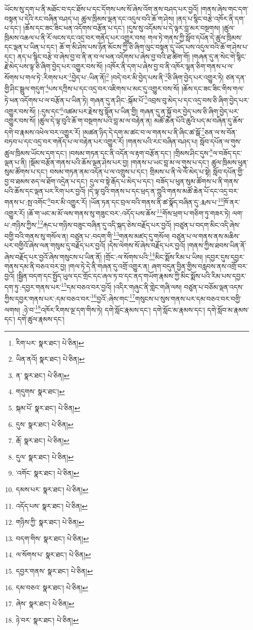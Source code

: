 ཡོངས་སུ་དག་པ་ནི་མཐོང་བ་དང་ཐོས་པ་དང་དོགས་པས་སོ་ཞེས་འོག་ནས་བཤད་པར་བྱའོ། །གནས་ཞེས་གང་དག་བསྟན་པ་དེའི་རང་བཞིན་བཤད་པ། ཚུལ་ཁྲིམས་ལྡན་དང་འདུལ་བའི་ཆོ་ག་ཤེས། །ནད་པ་སྙིང་བརྩེ་འཁོར་ནི་དག་པ་དང་། །ཆོས་དང་ཟང་ཟིང་ཕན་འདོགས་བརྩོན་པ་དང་། །དུས་སུ་འདོམས་པ་དེ་ལྟར་བླ་མར་བསྔགས། །ཚུལ་ཁྲིམས་འཆལ་པ་ནི་རོ་ལངས་དང་འདྲ་བར་གནོད་པར་འགྱུར་བས། གལ་ཏེ་གནས་ཀྱི་སློབ་དཔོན་དེ་ཚུལ་ཁྲིམས་དང་ལྡན་པ་ཡིན་པ་དང་། ཆོ་ག་མི་ཤེས་པས་ཉོན་མོངས་ཀྱི་ཅི་ཞིག་ལུང་བསྟན་དུ་ཡོད་པས་འདུལ་བའི་ཆོ་ག་ཤེས་པ་དང་། ནད་པ་སྙིང་བརྩེ་བ་ཞེས་བྱ་བ་ནི་ན་བ་ལ་ཕན་འདོགས་པ་ཞེས་བྱ་བའི་ཐ་ཚིག་གོ། །གཞན་དུ་ན་སེང་གེ་སྙིང་རྗེ་མེད་པས་ལྟ་ཅི་ཞིག་བྱེད་པར་འགྱུར་བས་སོ། །འཁོར་ནི་དག་པ་ཞེས་བྱ་བ་ནི་འཁོར་ལྷན་ཅིག་གནས་པ་ལ་སོགས་པ་གལ་ཏེ་:རིགས་པར་\footnote{རིག་པར་  སྣར་ཐང་།  པེ་ཅིན། }བྱེད་པ་:ཡིན་ནོ།\footnote{ཡིན་ནའོ།  སྣར་ཐང་།  པེ་ཅིན། } །བདེ་བར་མི་བྱེད་པས་ནི་\footnote{ན་  སྣར་ཐང་།  པེ་ཅིན། }ཅི་ཞིག་བྱེད་པར་འགྱུར་ཏེ། ཙན་དན་གྱི་ཤིང་སྦྲུལ་གདུག་\footnote{གདུགས་  སྣར་ཐང་། }པས་དཀྲིས་པ་དང་འདྲ་བར་འཇིགས་པ་མང་དུ་འགྱུར་བས་སོ། །ཆོས་དང་ཟང་ཟིང་གིས་གལ་ཏེ་ཕན་འདོགས་པ་ལ་བརྩོན་པ་ཡིན་ཏེ། གཞན་དུ་ན་ཤིང་:སྐོམ་པོ་\footnote{སྐམ་པོ་  སྣར་ཐང་།  པེ་ཅིན། }འབྲས་བུ་མེད་པ་དང་འདྲ་བས་ཅི་ཞིག་བྱེད་པར་འགྱུར་བས་སོ། །:དུས་དང་\footnote{དུས་  སྣར་ཐང་།  པེ་ཅིན། }འཚམ་པར་རྗེས་སུ་སྟོན་པ་ཡིན་གྱི། གཞན་དུ་ན་སྐྱོ་བར་བྱེད་པས་ཅི་ཞིག་བྱེད་པར་འགྱུར་བས་སོ། །ཚུལ་དེ་ལྟ་བུའི་ཆོ་ག་བསྔགས་པའི་བླ་མ་ལ་བརྟེན་ན། མཚོ་ཆེན་པོའི་ཆུའི་པད་མ་བཞིན་དུ་ཆོས་དགེ་བ་རྣམས་འཕེལ་བར་འགྱུར་རོ། །མཚན་ཉིད་དེ་དག་མ་ཚང་བ་ལ་གནས་པ་ནི་ཞིང་ཚ་སྒོ་\footnote{རྒོ་  སྣར་ཐང་།  པེ་ཅིན། }ཅན་ལ་ས་བོན་བཏབ་པ་དང་འདྲ་བར་གནོད་པ་ལ་བརྟེན་པར་འགྱུར་རོ། །གནས་པའི་རང་བཞིན་བཤད་པ། སློབ་དཔོན་ལ་གུས་ཚུལ་ཁྲིམས་ཡོངས་དག་དང་། །བསམ་གཏན་དང་ནི་འདོན་ལ་རྟག་བརྩོན་དང་། །གྲིམས་ཤིང་དུས་\footnote{དུལ་  སྣར་ཐང་།  པེ་ཅིན། }ལ་བཟོད་དང་ལྡན་པ་ནི། །སྡོམ་བརྩོན་གནས་པའི་ཆོས་ལྡན་ཤེས་པར་བྱ། །གནས་པ་ཡང་བླ་མ་ལ་གུས་པ་དང་། ཚུལ་ཁྲིམས་ཕུན་སུམ་ཚོགས་པ་དང་། བསམ་གཏན་ནམ་འདོན་པ་ལ་འགྲུས་པ་དང་། གྲིམས་པ་ནི་ལེ་ལོ་མེད་པ་སྟེ། སློབ་དཔོན་གྱི་བྱ་བ་ཐམས་ཅད་ལ་ཐོག་འདྲེན་པ་དང་། དུལ་བ་སྟེ་རྒོད་པ་མེད་པ་དང་། བཟོད་པ་ཕུན་སུམ་ཚོགས་པ་ནི་གནས་པའི་ཆོས་དང་ལྡན་པར་རིག་པར་བྱའོ། །དེ་ལྟ་བུའི་གནས་པ་དང་ཕྲད་ན་ཀླུའི་གནས་མཚོ་ཆེན་པོ་དང་འདྲ་བར་གནས་པ་:སྤ་འགོང་\footnote{་འགོང་  སྣར་ཐང་།  པེ་ཅིན། }བར་མི་འགྱུར་རོ། །ཡོན་ཏན་དང་བྲལ་བའི་གནས་ནི་ཚ་སྣོད་བཞིན་དུ་:རྨས་པ་\footnote{དམས་པར་  སྣར་ཐང་།  པེ་ཅིན། }ཁོ་ནར་འགྱུར་རོ། །ཆོ་ག་ཡང་མ་མོ་ལས་གནས་སུ་གཟུང་བར་:འདོད་པས་ཆོས་\footnote{འདོད་པས་  སྣར་ཐང་།  པེ་ཅིན། }གོས་ཕྲག་པ་གཅིག་ཏུ་གཟར་ཏེ། ལག་པ་:གཉིས་ཀྱིས་\footnote{གཉིས་ཀྱི་  སྣར་ཐང་།  པེ་ཅིན། }རྐང་པ་གཉིས་བཟུང་བཞིན་དུ་འདི་སྐད་ཅེས་བརྗོད་པར་བྱའོ། །བཙུན་པ་བདག་མིང་འདི་ཞེས་བགྱི་བའི་གནས་སུ་གསོལ་ན། བཙུན་པ་:བདག་གི་\footnote{བདག་གིས་  སྣར་ཐང་།  པེ་ཅིན། }གནས་མཛད་དུ་གསོལ། བཙུན་པ་ལ་གནས་ནས་མཆིས་པར་བགྱིའོ་ཞེས་ལན་གསུམ་དུ་བརྗོད་པར་བྱའོ། །དེས་ལེགས་སོ་ཞེས་བརྗོད་པར་བྱའོ། །གནས་ཀྱིས་ཐབས་ཡིན་ནོ་ཞེས་བརྗོད་པར་བྱའོ་ཞེས་གསུངས་པ་ཡིན་ནོ། །གྲོང་:ལ་སོགས་པའི་\footnote{ལ་སོགས་པ་  སྣར་ཐང་།  པེ་ཅིན། }མིང་སྨོས་རིམ་པ་ཡིས། །དབྱར་དུས་དབྱར་གནས་དམ་ནི་བཅའ་བར་བྱ། །གལ་ཏེ་དེ་ནི་གཞན་དུ་འགྲོ་འགྱུར་ན། ཞག་བདུན་བྱིན་གྱིས་བརླབས་ནས་འགྲོ་བར་བྱའོ། །སྦྱིན་བདག་དང་སྤྱོད་ཡུལ་དང་གྲོང་དང་ཞལ་ཏ་བ་དང་ནད་གཡོག་རྣམས་ཀྱི་མིང་སྨོས་པའི་རིམ་པས་དབྱར་དག་ཏུ་:དབྱར་གནས་པར་\footnote{དབྱར་གནས་  སྣར་ཐང་།  པེ་ཅིན། }དམ་བཅའ་བར་བྱའོ། །འདིར་གཞུང་ནི་གླེང་གཞི་ལས། བཙུན་པ་བཅོམ་ལྡན་འདས་ཀྱིས་དབྱར་གནས་པར་:དམ་བཅའ་བར་\footnote{དམ་བཅའ་  སྣར་ཐང་།  པེ་ཅིན། }བྱའོ་:ཞེས་གང་\footnote{ཞེས་  སྣར་ཐང་།  པེ་ཅིན། }གསུངས་པ་སུས་གནས་པར་དམ་བཅའ་བར་བགྱི་ལགས། :ཉེ་བ་\footnote{ཉེ་བར་  སྣར་ཐང་།  པེ་ཅིན། }འཁོར་རིགས་ལྔ་དག་གིས་ཏེ། དགེ་སློང་རྣམས་དང་། དགེ་སློང་མ་རྣམས་དང་། དགེ་སློབ་མ་རྣམས་དང་། དགེ་ཚུལ་རྣམས་དང་། 